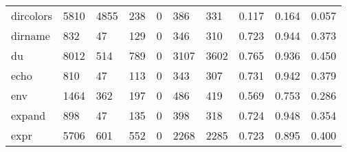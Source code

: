 \begin{longtable}{lp{1.3cm}p{1.3cm}p{1.3cm}p{1.3cm}p{1.3cm}p{1.3cm}p{1.3cm}p{1.3cm}p{1.3cm}}
dircolors &                   5810 &                               4855 &                               238 &                                0 &                               386 &                             331 &                                   0.117 &                                  0.164 &                                0.057 \\
dirname   &                    832 &                                 47 &                               129 &                                0 &                               346 &                             310 &                                   0.723 &                                  0.944 &                                0.373 \\
du        &                   8012 &                                514 &                               789 &                                0 &                              3107 &                            3602 &                                   0.765 &                                  0.936 &                                0.450 \\
echo      &                    810 &                                 47 &                               113 &                                0 &                               343 &                             307 &                                   0.731 &                                  0.942 &                                0.379 \\
env       &                   1464 &                                362 &                               197 &                                0 &                               486 &                             419 &                                   0.569 &                                  0.753 &                                0.286 \\
expand    &                    898 &                                 47 &                               135 &                                0 &                               398 &                             318 &                                   0.724 &                                  0.948 &                                0.354 \\
expr      &                   5706 &                                601 &                               552 &                                0 &                              2268 &                            2285 &                                   0.723 &                                  0.895 &                                0.400 \\

\end{longtable}
